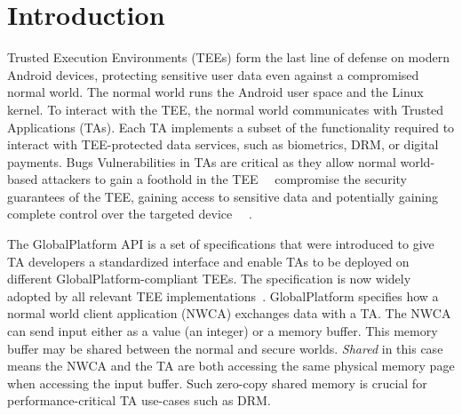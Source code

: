 \documentclass[conference]{IEEEtran} %
\providecommand{\DIFaddtex}[1]{{\protect\color{blue} \sf #1}} %
\providecommand{\DIFdeltex}[1]{{\protect\color{red} \scriptsize #1}} %
\providecommand{\DIFaddbegin}{} %
\providecommand{\DIFaddend}{} %
\providecommand{\DIFdelbegin}{} %
\providecommand{\DIFdelend}{} %
\providecommand{\DIFadd}[1]{\texorpdfstring{\DIFaddtex{#1}}{#1}} %
\providecommand{\DIFdel}[1]{\texorpdfstring{\DIFdeltex{#1}}{}} %
\begin{document}

\IEEEpeerreviewmaketitle
\DIFaddend 

\section{Introduction}\label{sec:introduction}

Trusted Execution Environments (TEEs) form the last line of defense on modern 
Android devices, protecting sensitive \DIFaddbegin \DIFadd{user }\DIFaddend data even against a 
compromised normal world. The normal world runs the Android user space and the 
Linux kernel. To interact with the TEE, the normal world communicates with 
Trusted Applications (TAs). Each TA implements a subset of the functionality 
required to interact with TEE-protected \DIFdelbegin \DIFdel{data}\DIFdelend \DIFaddbegin \DIFadd{services}\DIFaddend , such as biometrics, DRM, or 
digital payments. \DIFdelbegin \DIFdel{Bugs }\DIFdelend \DIFaddbegin \DIFadd{Vulnerabilities }\DIFaddend in TAs are critical as they allow normal 
world-based attackers to \DIFdelbegin \DIFdel{gain a foothold in the TEE~\mbox{%
\cite{beniaini2017trustissues,berard2018kinibi,busch2020finding,rollback,globalconfusion,Komaromy2021UnboxYourPhone,Li2024DiveIntoAndroidTA,AdamskiGuilbonPeterlin2019SamsungTrustZone,Makkaveev2019TrustZoneFuzzing,AdamTC}}\hskip0pt%
}\DIFdelend \DIFaddbegin \DIFadd{compromise the security guarantees of the TEE, 
gaining access to sensitive data and potentially gaining complete control over 
the targeted device~\mbox{%
\cite{beniaini2017trustissues,
berard2018kinibi,busch2020finding,rollback,globalconfusion,Komaromy2021UnboxYourPhone,
Li2024DiveIntoAndroidTA,AdamskiGuilbonPeterlin2019SamsungTrustZone,
Makkaveev2019TrustZoneFuzzing,AdamTC}}\hskip0pt%
}\DIFaddend . 

The GlobalPlatform API is a set of specifications that were introduced to 
give TA developers a standardized interface and enable TAs to be deployed on 
different GlobalPlatform-compliant TEEs. The specification is now widely adopted by all  
relevant TEE implementations~\cite{globalconfusion}. GlobalPlatform specifies how a normal 
world client application (NWCA) exchanges data with a TA. The NWCA can send input either as a value (an 
integer) or a memory buffer. This memory buffer may be shared between the 
normal and secure worlds. \textit{Shared} in this case means the NWCA and the TA are both 
accessing the same physical memory page when accessing the input buffer. Such zero-copy 
shared memory is crucial for performance-critical TA use-cases such as DRM.
\end{document}
